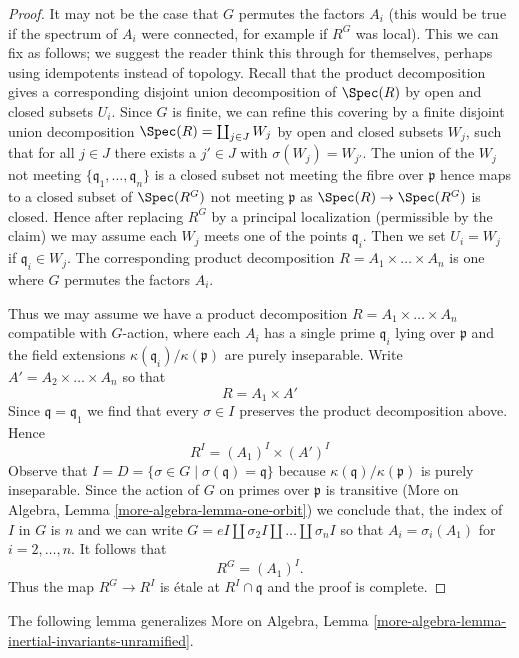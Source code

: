 \begin{proof}
\medskip\noindent
It may not be the case that $G$ permutes the factors $A_i$
(this would be true if the spectrum of $A_i$ were connected,
for example if $R^G$ was local). This we can fix as follows;
we suggest the reader think this through for themselves, perhaps
using idempotents instead of topology.
Recall that the product decomposition gives a corresponding
disjoint union decomposition of $\Spec(R)$ by open and closed
subsets $U_i$. Since $G$ is finite, we can refine this covering
by a finite disjoint union decomposition
$\Spec(R) = \coprod_{j \in J} W_j$ by open
and closed subsets $W_j$, such that for all $j \in J$ there exists
a $j' \in J$ with $\sigma(W_j) = W_{j'}$. The union of the
$W_j$ not meeting $\{\mathfrak q_1, \ldots, \mathfrak q_n\}$
is a closed subset not meeting the fibre over $\mathfrak p$
hence maps to a closed subset of $\Spec(R^G)$ not meeting
$\mathfrak p$ as $\Spec(R) \to \Spec(R^G)$ is closed.
Hence after replacing $R^G$ by a principal localization
(permissible by the claim) we may assume each $W_j$ meets
one of the points $\mathfrak q_i$. Then we set $U_i = W_j$
if $\mathfrak q_i \in W_j$. The corresponding product decomposition
$R = A_1 \times \ldots \times A_n$ is one
where $G$ permutes the factors $A_i$.

\medskip\noindent
Thus we may assume we have a product decomposition
$R = A_1 \times \ldots \times A_n$ compatible with $G$-action,
where each $A_i$ has a single prime $\mathfrak q_i$ lying
over $\mathfrak p$ and the field extensions
$\kappa(\mathfrak q_i)/\kappa(\mathfrak p)$ are purely inseparable.
Write $A' = A_2 \times \ldots \times A_n$ so that
$$
R = A_1 \times A'
$$
Since $\mathfrak q = \mathfrak q_1$ we find that every
$\sigma \in I$ preserves the product decomposition above.
Hence
$$
R^I = (A_1)^I \times (A')^I
$$
Observe that $I = D = \{\sigma \in G \mid \sigma(\mathfrak q) = \mathfrak q\}$
because $\kappa(\mathfrak q)/\kappa(\mathfrak p)$ is purely inseparable.
Since the action of $G$ on primes over $\mathfrak p$ is transitive
(More on Algebra, Lemma \ref{more-algebra-lemma-one-orbit})
we conclude that, the index of $I$ in $G$ is $n$ and we can write
$G = eI \amalg \sigma_2I \amalg \ldots \amalg \sigma_nI$ so that
$A_i = \sigma_i(A_1)$ for $i = 2, \ldots, n$. It follows that
$$
R^G = (A_1)^I.
$$
Thus the map $R^G \to R^I$ is \'etale at $R^I \cap \mathfrak q$
and the proof is complete.
\end{proof}

The following lemma generalizes
More on Algebra, Lemma \ref{more-algebra-lemma-inertial-invariants-unramified}.

